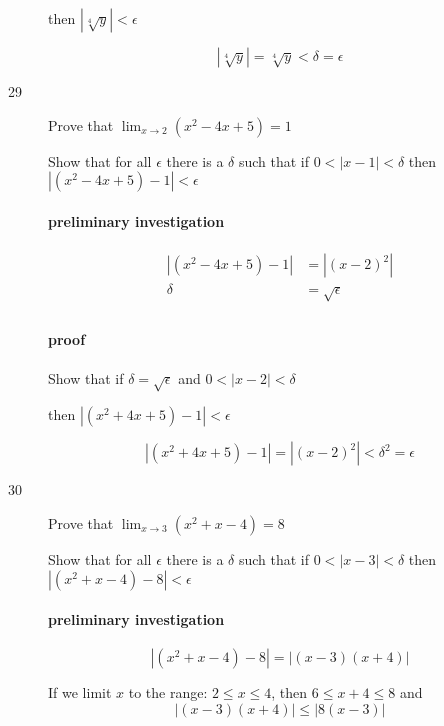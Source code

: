 \documentclass[letterpaper, landscape]{exam}
\begin{document}
\begin{description}
        then $| \sqrt[4]{y} | < \epsilon$

        \[
          | \sqrt[4]{y} | = \sqrt[4]{y} < \delta = \epsilon
        \]

      \item[29] Prove that $\lim_{x \to 2} \left( x^2 - 4x + 5 \right) = 1$

        Show that for all $\epsilon$ there is a $\delta$ such that if 
        $0 < |x - 1| < \delta$ then $ \left| \left( x^2 - 4x + 5 \right) - 1 \right| < \epsilon$

        \paragraph{preliminary investigation}
        \begin{align*}
          \left| \left( x^2 - 4x + 5 \right) - 1 \right| & = |(x - 2)^2| \\
          \delta                                         & = \sqrt{ \epsilon } \\
        \end{align*}

        \paragraph{proof}
        Show that if $\delta = \sqrt{ \epsilon }$ and 
        $0 < |x - 2| < \delta$ 
        
        then $\left| \left( x^2 + 4x + 5 \right) - 1 \right| < \epsilon$

        \[
          \left| \left( x^2 + 4x + 5 \right) - 1 \right| = |(x - 2)^2| < \delta^2 = \epsilon
        \]

      \newpage

      \item[30] Prove that $\lim_{x \to 3} \left( x^2 + x - 4 \right) = 8$

        Show that for all $\epsilon$ there is a $\delta$ such that if 
        $0 < |x - 3| < \delta$ then $\left| \left( x^2 + x - 4 \right) - 8 \right| < \epsilon$

        \paragraph{preliminary investigation}

        \[
          \left| \left( x^2 + x - 4 \right) - 8 \right| = |(x - 3)(x + 4)| 
        \]

        If we limit $x$ to the range: $2 \leq x \leq 4$, then $6 \leq x + 4 \leq 8$ and
        \[
          |(x - 3)(x + 4)| \leq |8 (x - 3)|
        \]


\end{description}
\end{document}
